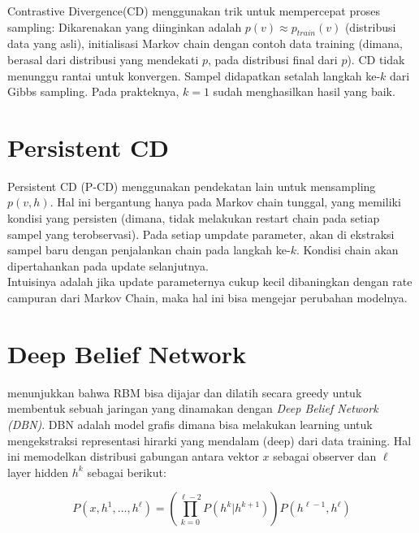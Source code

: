Contrastive Divergence(CD) menggunakan trik untuk mempercepat proses sampling: Dikarenakan yang diinginkan adalah $p(v) \approx p_{train}(v)$ (distribusi data yang asli), initialisasi  Markov chain dengan contoh data training (dimana, berasal dari distribusi yang mendekati $p$, pada distribusi final dari $p$). CD tidak menunggu rantai untuk konvergen. Sampel didapatkan setalah langkah ke-$k$ dari Gibbs sampling. Pada prakteknya, $k=1$ sudah menghasilkan hasil yang baik.\\

\section{Persistent CD}

Persistent CD (P-CD) \citep{bengio2007greedy} menggunakan pendekatan lain untuk mensampling $p(v,h)$. Hal ini bergantung hanya pada Markov chain tunggal, yang memiliki kondisi yang persisten (dimana, tidak melakukan restart chain pada setiap sampel yang terobservasi). Pada setiap umpdate parameter, akan di ekstraksi sampel baru dengan penjalankan chain pada langkah ke-$k$. Kondisi chain akan dipertahankan pada update selanjutnya.\\
Intuisinya adalah jika update parameternya cukup kecil dibaningkan dengan rate campuran dari Markov Chain, maka hal ini bisa mengejar perubahan modelnya.



\section{Deep Belief Network}

\cite{hinton2006fast} menunjukkan bahwa RBM bisa dijajar dan dilatih secara greedy untuk membentuk sebuah jaringan yang dinamakan dengan \textit{Deep Belief Network (DBN)}. DBN adalah model grafis dimana bisa melakukan learning untuk mengekstraksi representasi hirarki yang mendalam (deep) dari data training. Hal ini memodelkan distribusi gabungan antara vektor $x$ sebagai observer dan $\ell$ layer hidden $h^k$ sebagai berikut:

\begin{equation}
P(x, h^1, \ldots, h^{\ell}) = \left(\prod_{k=0}^{\ell-2} P(h^k|h^{k+1})\right) P(h^{\ell-1},h^{\ell})
\end{equation}

